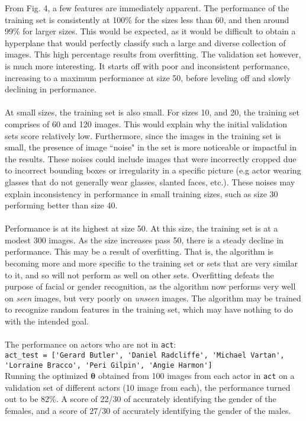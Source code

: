 \documentclass{article}
\begin{document}
From Fig. 4, a few features are immediately apparent. The performance of the training set is consistently at 100\% for the sizes less than 60, and then around 99\% for larger sizes. This would be expected, as it would be difficult to obtain a hyperplane that would perfectly classify such a large and diverse collection of images. This high percentage results from overfitting. The validation set however, is much more interesting. It starts off with poor and inconsistent performance, increasing to a maximum performance at size 50, before leveling off and slowly declining in performance. \\
\\
At small sizes, the training set is also small. For sizes 10, and 20, the training set comprises of 60 and 120 images. This would explain why the initial validation sets score relatively low. Furthermore, since the images in the training set is small, the presence of image ``noise" in the set is more noticeable or impactful in the results. These noises could include images that were incorrectly cropped due to incorrect bounding boxes or irregularity in a specific picture (e.g actor wearing glasses that do not generally wear glasses, slanted faces, etc.). These noises may explain inconsistency in performance in small training sizes, such as size 30 performing better than size 40. \\
\\
Performance is at its highest at size 50. At this size, the training set is at a modest 300 images. As the size increases pass 50, there is a steady decline in performance. This may be a result of overfitting. That is, the algorithm is becoming more and more specific to the training set or sets that are very similar to it, and so will not perform as well on other sets. Overfitting defeats the purpose of facial or gender recognition, as the algorithm now performs very well on \textit{seen} images, but very poorly on \textit{unseen} images. The algorithm may be trained to recognize random features in the training set, which may have nothing to do with the intended goal. \\
\\
The performance on actors who are not in \verb|act|:\\
\verb|act_test = ['Gerard Butler', 'Daniel Radcliffe', 'Michael Vartan',|\\
\verb|'Lorraine Bracco', 'Peri Gilpin', 'Angie Harmon']|\\

Running the optimized $\boldsymbol \theta$ obtained from 100 images from each actor in \verb|act| on a validation set of different actors (10 image from each), the performance turned out to be 82\%. A score of 22/30 of accurately identifying the gender of the females, and a score of 27/30 of accurately identifying the gender of the males. 
\end{document}
